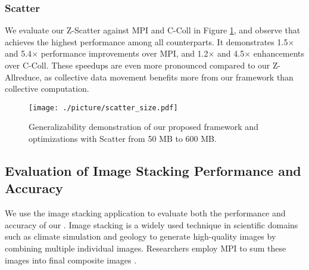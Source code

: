 \subsubsection{Scatter}\label{sec-eval-scatter}

We evaluate our Z-Scatter against MPI and C-Coll in Figure \ref{fig-portability-scatter}, and observe that {\pname} achieves the highest performance among all counterparts. It demonstrates 1.5$\times$ and 5.4$\times$ performance improvements over MPI, and 1.2$\times$ and 4.5$\times$ enhancements over C-Coll. These speedups are even more pronounced compared to our Z-Allreduce, as collective data movement benefits more from our framework than collective computation.


\begin{figure}[ht]
    \centering
    {\texttt{[image: ./picture/scatter\_size.pdf]}}
    \caption{Generalizability demonstration of our proposed framework and optimizations with Scatter from 50 MB to 600 MB.} 
    \label{fig-portability-scatter}
\end{figure}

\subsection{Evaluation of Image Stacking Performance and Accuracy}
\label{sec-image-stacking}

We use the image stacking application to evaluate both the performance and accuracy of our {\pname}. Image stacking is a widely used technique in scientific domains such as climate simulation and geology to generate high-quality images by combining multiple individual images. Researchers employ MPI to sum these images into final composite images \cite{Gurhem2021Kirchhoff}.





